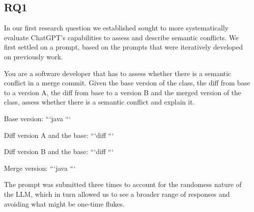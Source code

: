 \subsection{RQ1}

In our first research question we established sought to more systematically evaluate ChatGPT's capabilities to assess and describe semantic conflicts.
We first settled on a prompt, based on the prompts that were iteratively developed on previously work.

\begin{prompt}
You are a software developer that has to assess whether there is a semantic conflict in a merge commit.  Given the base version of the class, the diff from base to a version A, the diff from base to a version B and the merged version of the class, assess whether there is a semantic conflict and explain it.

Base version:
```java
```

Diff version A and the base:
```diff
```

Diff version B and the base:
```diff
```

Merge version:
```java
```
\end{prompt}

The prompt was submitted three times to account for the randomess nature of the
LLM, which in turn allowed us to see a broader range of responses and avoiding
what might be one-time flukes.

